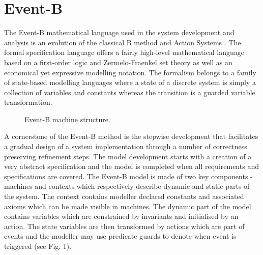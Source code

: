 \section{Event-B}

The Event-B mathematical language used in the system development and analysis is an evolution of the classical B
method \cite{abrial2005b} and Action Systems \cite{ActionSystems}. %
The formal specification language offers a fairly high-level mathematical language
based on a first-order logic and Zermelo-Fraenkel set theory as well as an economical yet expressive modelling notation.
The formalism belongs to a family of state-based modelling languages where a state of a discrete system is simply a
collection of variables and constants whereas the transition is a guarded variable transformation. 

\begin{figure}[h]
	\footnotesize{
		\centering
	}
	\caption{Event-B machine structure.}
	\label{EventB_structure}
\end{figure}

A cornerstone of the Event-B method is the stepwise development that facilitates a gradual design of a system implementation through a number of correctness preserving refinement steps. The model development starts with a creation of a very abstract specification and the model is completed
when all requirements and specifications are covered. The Event-B model is made of two key components - machines and contexts which respectively describe dynamic and static parts of the system. The context contains modeller
declared constants and associated axioms which can be made visible in machines. The dynamic part of the model contains
variables which are constrained by invariants and initialised by an action. The state variables are then transformed by actions which are part of events and the modeller may use predicate
guards to denote when event is triggered (see Fig. 1). 

